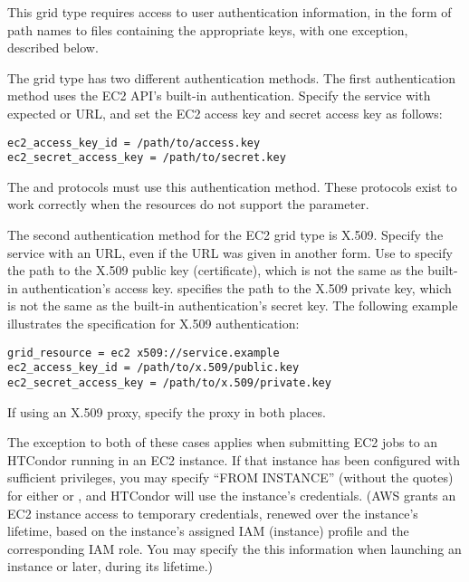 This grid type requires access to user authentication information,
in the form of path names to files containing the appropriate keys,
with one exception, described below.

The  grid type has two different authentication methods.
The first authentication method uses the EC2 API's built-in authentication.
Specify the service with expected  or  URL,
and set the EC2 access key and secret access key as follows:

\begin{verbatim}
ec2_access_key_id = /path/to/access.key
ec2_secret_access_key = /path/to/secret.key
\end{verbatim}

The  and  protocols must use this
authentication method.
These protocols exist to work correctly when the resources do not support
the  parameter.

The second authentication method for the EC2 grid type is X.509.
Specify the service with an  URL, 
even if the URL was given in another form.  
Use  to 
specify the path to the X.509 public key (certificate),
which is not the same as the built-in authentication's access key.
 specifies the path to the X.509 
private key,
which is not the same as the built-in authentication's secret key.
The following example illustrates the specification for X.509 authentication:

\begin{verbatim}
grid_resource = ec2 x509://service.example
ec2_access_key_id = /path/to/x.509/public.key
ec2_secret_access_key = /path/to/x.509/private.key
\end{verbatim}

If using an X.509 proxy, specify the proxy in both places.

The exception to both of these cases applies when submitting EC2 jobs
to an HTCondor running in an EC2 instance.  If that instance has been
configured with sufficient privileges, you may specify ``FROM INSTANCE''
(without the quotes) for either  or
, and HTCondor will use the
instance's credentials.  (AWS grants an EC2 instance access to temporary
credentials, renewed over the instance's lifetime, based on the instance's
assigned IAM (instance) profile and the corresponding IAM role.  You may
specify the this information when launching an instance or later, during
its lifetime.)

